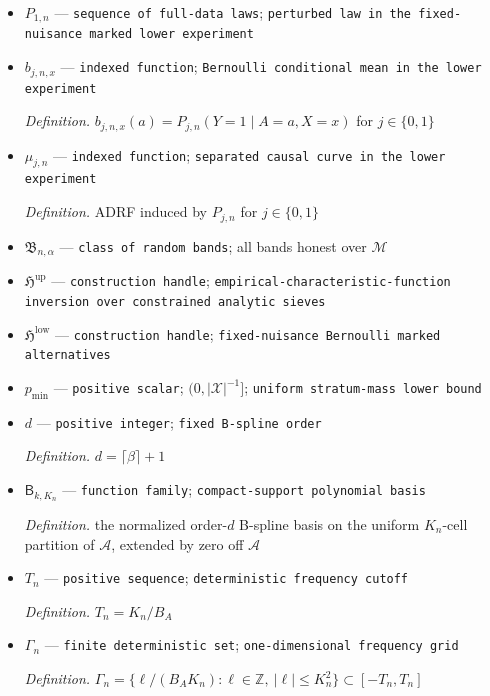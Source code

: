\documentclass{article}
\begin{document}
\begin{itemize}
  \item \(P_{1,n}\) --- \texttt{sequence of full-\allowbreak{}data laws}; \texttt{perturbed law in the fixed-\allowbreak{}nuisance marked lower experiment}
  \item \(b_{j,n,x}\) --- \texttt{indexed function}; \texttt{Bernoulli conditional mean in the lower experiment}
  \par\smallskip\noindent\emph{Definition.} \(b_{j,n,x}(a)=P_{j,n}(Y=1\mid A=a,X=x)\) for \(j\in\{0,1\}\)
  \item \(\mu_{j,n}\) --- \texttt{indexed function}; \texttt{separated causal curve in the lower experiment}
  \par\smallskip\noindent\emph{Definition.} ADRF induced by \(P_{j,n}\) for \(j\in\{0,1\}\)
  \item \(\mathfrak B_{n,\alpha}\) --- \texttt{class of random bands}; all bands honest over \(\mathcal M\)
  \item \(\mathfrak H^{\mathrm{up}}\) --- \texttt{construction handle}; \texttt{empirical-\allowbreak{}characteristic-\allowbreak{}function inversion over constrained analytic sieves}
  \item \(\mathfrak H^{\mathrm{low}}\) --- \texttt{construction handle}; \texttt{fixed-\allowbreak{}nuisance Bernoulli marked alternatives}
  \item \(p_{\min}\) --- \texttt{positive scalar}; \((0,|\mathcal X|^{-1}]\); \texttt{uniform stratum-\allowbreak{}mass lower bound}
  \item \(d\) --- \texttt{positive integer}; \texttt{fixed B-\allowbreak{}spline order}
  \par\smallskip\noindent\emph{Definition.} \(d=\lceil\beta\rceil+1\)
  \item \(\mathsf B_{k,K_n}\) --- \texttt{function family}; \texttt{compact-\allowbreak{}support polynomial basis}
  \par\smallskip\noindent\emph{Definition.} the normalized order-\(d\) B-spline basis on the uniform \(K_n\)-cell partition of \(\mathcal A\), extended by zero off \(\mathcal A\)
  \item \(T_n\) --- \texttt{positive sequence}; \texttt{deterministic frequency cutoff}
  \par\smallskip\noindent\emph{Definition.} \(T_n=K_n/B_A\)
  \item \(\Gamma_n\) --- \texttt{finite deterministic set}; \texttt{one-\allowbreak{}dimensional frequency grid}
  \par\smallskip\noindent\emph{Definition.} \(\Gamma_n=\{\ell/(B_AK_n):\ell\in\mathbb Z,\ |\ell|\le K_n^2\}\subset[-T_n,T_n]\)

\end{itemize}
\end{document}

